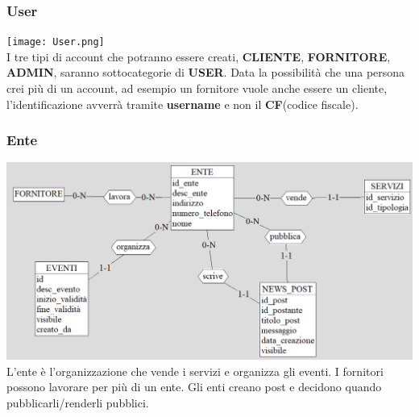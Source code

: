 \subsubsection{User}
\texttt{[image: User.png]}\\
I tre tipi di account che potranno essere creati, \textbf{CLIENTE}, \textbf{FORNITORE}, \textbf{ADMIN},  saranno sottocategorie di \textbf{USER}. Data la possibilità che una persona crei più di un account, ad esempio un fornitore vuole anche essere un cliente, l'identificazione avverrà tramite \textbf{username} e non il \textbf{CF}(codice fiscale).



\subsubsection{Ente}
\includegraphics[width=0.95\columnwidth]{images/Ente.png} \\
L'ente è l'organizzazione che vende i servizi e organizza gli eventi. 
I fornitori possono lavorare per più di un ente.
Gli enti creano post e decidono quando pubblicarli/renderli pubblici. 


